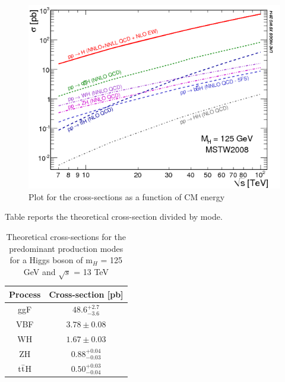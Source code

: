 \begin{figure}
    \centering
    \includegraphics[width= \textwidth]{images/cross_section.png}
    \caption{Plot for the cross-sections as a function of CM energy}
    \label{cross-section}
\end{figure}
Table reports the theoretical cross-section divided by mode.
\begin{table}[ht]
    \centering
    \begin{tabular}{c|c}
         Process & Cross-section [pb]\footnotemark \\\hline
         ggF &  $48.6^{+2.7}_{-3.6}$ \\\hline
         VBF  & $3.78 \pm 0.08$\\\hline
         WH & $1.67\pm 0.03$\\\hline
         ZH & $0.88^{+0.04}_{-0.03}$ \\\hline
         t$\Bar{\text{t}}$H & $0.50^{+0.03}_{-0.04}$\\\hline 
    \end{tabular}
    \caption{Theoretical cross-sections for the predominant production modes for a Higgs boson of m$_H$ = 125 GeV and $\sqrt{s}$ = 13 TeV}
    \label{tab:cross-section}
\end{table}
